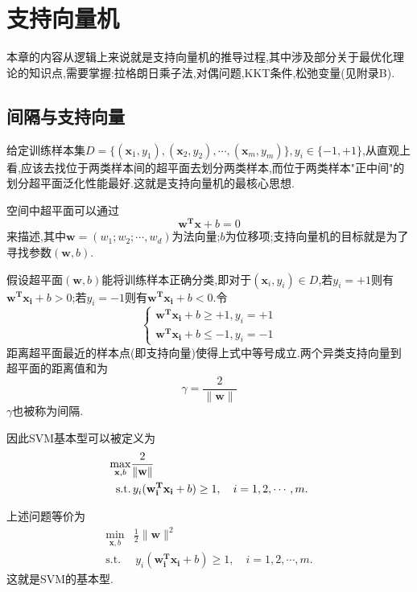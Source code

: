 \chapter{支持向量机}

本章的内容从逻辑上来说就是支持向量机的推导过程,其中涉及部分关于最优化理论的知识点,需要掌握:拉格朗日乘子法,对偶问题,KKT条件,松弛变量(见附录B).

\section{间隔与支持向量}

给定训练样本集$D=\{(\mathbf x_1, y_1),(\mathbf x_2, y_2),\cdots,(\mathbf x_m, y_m)\},y_i\in\{-1,+1\}$,从直观上看,应该去找位于两类样本间的超平面去划分两类样本,而位于两类样本"正中间"的划分超平面泛化性能最好.这就是支持向量机的最核心思想.

空间中超平面可以通过
\begin{equation}
\mathbf {w^Tx}+b=0
\end{equation}
来描述,其中$\mathbf w=(w_1;w_2;\cdots,w_d)$为法向量;$b$为位移项;支持向量机的目标就是为了寻找参数$(\mathbf w,b)$.

假设超平面$(\mathbf w,b)$能将训练样本正确分类,即对于$(\mathbf x_i,y_i)\in D$,若$y_i=+1$则有$\mathbf {w^Tx_i}+b>0$;若$y_i=-1$则有$\mathbf{w^Tx_i}+b<0$.令
\begin{equation}
\left\{
\begin{array}{ll}
\mathbf{w^Tx_i}+b\ge +1,y_i=+1 \\
\mathbf{w^Tx_i}+b\le -1,y_i=-1
\end{array}
\right.
\end{equation}
距离超平面最近的样本点(即支持向量)使得上式中等号成立.两个异类支持向量到超平面的距离值和为
\begin{equation}
\gamma=\frac{2}{\|\mathbf w\|}
\end{equation}
$\gamma$也被称为间隔.

因此SVM基本型可以被定义为
\begin{equation}\begin{split}
\max_{\mathbf x,b}&\frac{2}{\|\mathbf w\|} \\
\text{\text{s.t.}}& \,y_i(\mathbf{w_i^Tx_i}+b)\ge 1,\quad i=1,2,\cdots,m.
\end{split}\end{equation}

上述问题等价为
\begin{equation}\begin{split}
\min_{\mathbf x,b}&\frac{1}{2}\|\mathbf w\|^2 \\
\text{s.t.}& \,y_i(\mathbf{w_i^Tx_i}+b)\ge 1,\quad i=1,2,\cdots,m.
\end{split}\end{equation}
这就是SVM的基本型.

